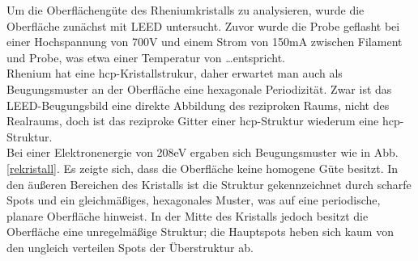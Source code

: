 \FloatBarrier

Um die Oberflächengüte des Rheniumkristalls zu analysieren, wurde die Oberfläche zunächst mit LEED
untersucht. Zuvor wurde die Probe geflasht bei einer Hochspannung von 700V und einem Strom
von 150mA zwischen Filament und Probe, was etwa einer Temperatur von \ldots entspricht.\\
Rhenium hat eine hcp-Kristallstrukur, daher erwartet man auch als Beugungsmuster an der Oberfläche
eine hexagonale Periodizität. Zwar ist das LEED-Beugungsbild eine direkte Abbildung des reziproken
Raums, nicht des Realraums, doch ist das reziproke Gitter einer hcp-Struktur wiederum eine
hcp-Struktur.\\
Bei einer Elektronenergie von 208eV ergaben sich Beugungsmuster wie in Abb. \ref{rekristall}. Es
zeigte sich, dass die Oberfläche keine homogene Güte besitzt. In den äußeren Bereichen des Kristalls
ist die Struktur gekennzeichnet durch scharfe Spots und ein gleichmäßiges, hexagonales Muster, was
auf eine periodische, planare Oberfläche hinweist. In der Mitte des Kristalls jedoch besitzt die
Oberfläche eine unregelmäßige Struktur; die Hauptspots heben sich kaum von den ungleich verteilen
Spots der Überstruktur ab. 

